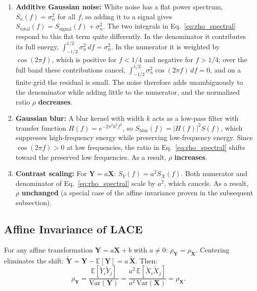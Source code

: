 \documentclass{bmvc2k}
\begin{document}
\begin{enumerate}
    \item \textbf{Additive Gaussian noise:} White noise has a flat power spectrum, $S_n(f) = \sigma_n^2$ for all $f$, so adding it to a signal gives $S_{\text{total}}(f) = S_{\text{signal}}(f) + \sigma_n^2$. The two integrals in Eq.~\ref{eq:rho_spectral} respond to this flat term quite differently. In the denominator it contributes its full energy, $\int_{-1/2}^{1/2}\sigma_n^2\,df = \sigma_n^2$. In the numerator it is weighted by $\cos(2\pi f)$, which is positive for $f < 1/4$ and negative for $f > 1/4$; over the full band these contributions cancel, $\int_{-1/2}^{1/2}\sigma_n^2\cos(2\pi f)\,df = 0$, and on a finite grid the residual is small. The noise therefore adds unambiguously to the denominator while adding little to the numerator, and the normalized ratio $\rho$ \textbf{decreases}.

    \item \textbf{Gaussian blur:} A blur kernel with width $k$ acts as a low-pass filter with transfer function $H(f) = e^{-2\pi^2 k^2 f^2}$, so $S_{\text{blur}}(f) = |H(f)|^2 S(f)$, which suppresses high-frequency energy while preserving low-frequency energy. Since $\cos(2\pi f) > 0$ at low frequencies, the ratio in Eq.~\ref{eq:rho_spectral} shifts toward the preserved low frequencies. As a result, $\rho$ \textbf{increases}.

    \item \textbf{Contrast scaling:} For $\mathbf{Y} = a\mathbf{X}$: $S_Y(f) = a^2 S_X(f)$. Both numerator and denominator of Eq.~\ref{eq:rho_spectral} scale by $a^2$, which cancels. As a result, $\rho$ \textbf{unchanged} (a special case of the affine invariance proven in the subsequent subsection). 
\end{enumerate}


\subsection{Affine Invariance of LACE}

For any affine transformation $\mathbf{Y} = a\mathbf{X} + b$ with $a \neq 0$: $\rho_{\mathbf{Y}} = \rho_{\mathbf{X}}$. Centering eliminates the shift: $\tilde{\mathbf{Y}} = \mathbf{Y} - \mathbb{E}[\mathbf{Y}] = a\,\tilde{\mathbf{X}}$. Then:
\begin{equation}
    \rho_{\mathbf{Y}} = \frac{\mathbb{E}[\tilde{Y}_i \tilde{Y}_j]}{\mathrm{Var}(\mathbf{Y})} = \frac{a^2\,\mathbb{E}[\tilde{X}_i \tilde{X}_j]}{a^2\,\mathrm{Var}(\mathbf{X})} = \rho_{\mathbf{X}}. 
\end{equation}
\end{document}
